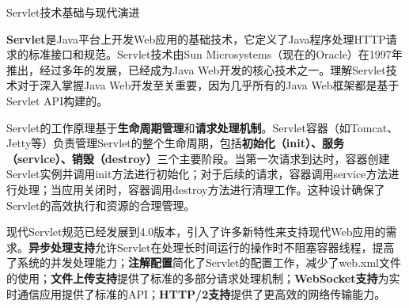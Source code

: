  Servlet技术基础与现代演进

\textbf{Servlet}是Java平台上开发Web应用的基础技术，它定义了Java程序处理HTTP请求的标准接口和规范。Servlet技术由Sun Microsystems（现在的Oracle）在1997年推出，经过多年的发展，已经成为Java Web开发的核心技术之一。理解Servlet技术对于深入掌握Java Web开发至关重要，因为几乎所有的Java Web框架都是基于Servlet API构建的。

Servlet的工作原理基于\textbf{生命周期管理}和\textbf{请求处理机制}。Servlet容器（如Tomcat、Jetty等）负责管理Servlet的整个生命周期，包括\textbf{初始化（init）、服务（service）、销毁（destroy）}三个主要阶段。当第一次请求到达时，容器创建Servlet实例并调用init方法进行初始化；对于后续的请求，容器调用service方法进行处理；当应用关闭时，容器调用destroy方法进行清理工作。这种设计确保了Servlet的高效执行和资源的合理管理。

现代Servlet规范已经发展到4.0版本，引入了许多新特性来支持现代Web应用的需求。\textbf{异步处理支持}允许Servlet在处理长时间运行的操作时不阻塞容器线程，提高了系统的并发处理能力；\textbf{注解配置}简化了Servlet的配置工作，减少了web.xml文件的使用；\textbf{文件上传支持}提供了标准的多部分请求处理机制；\textbf{WebSocket支持}为实时通信应用提供了标准的API；\textbf{HTTP/2支持}提供了更高效的网络传输能力。

